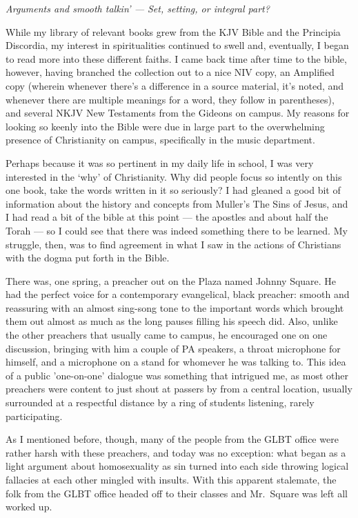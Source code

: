 \emph{Arguments and smooth talkin' --- Set, setting, or integral part?}

While my library of relevant books grew from the KJV Bible and the Principia Discordia, my interest in spiritualities continued to swell and, eventually, I began to read more into these different faiths. I came back time after time to the bible, however, having branched the collection out to a nice NIV copy, an Amplified copy (wherein whenever there's a difference in a source material, it's noted, and whenever there are multiple meanings for a word, they follow in parentheses), and several NKJV New Testaments from the Gideons on campus. My reasons for looking so keenly into the Bible were due in large part to the overwhelming presence of Christianity on campus, specifically in the music department.

Perhaps because it was so pertinent in my daily life in school, I was very interested in the `why' of Christianity. Why did people focus so intently on this one book, take the words written in it so seriously? I had gleaned a good bit of information about the history and concepts from Muller's The Sins of Jesus, and I had read a bit of the bible at this point --- the apostles and about half the Torah --- so I could see that there was indeed something there to be learned. My struggle, then, was to find agreement in what I saw in the actions of Christians with the dogma put forth in the Bible.

There was, one spring, a preacher out on the Plaza named Johnny Square. He had the perfect voice for a contemporary evangelical, black preacher: smooth and reassuring with an almost sing-song tone to the important words which brought them out almost as much as the long pauses filling his speech did. Also, unlike the other preachers that usually came to campus, he encouraged one on one discussion, bringing with him a couple of PA speakers, a throat microphone for himself, and a microphone on a stand for whomever he was talking to. This idea of a public 'one-on-one' dialogue was something that intrigued me, as most other preachers were content to just shout at passers by from a central location, usually surrounded at a respectful distance by a ring of students listening, rarely participating.

As I mentioned before, though, many of the people from the GLBT office were rather harsh with these preachers, and today was no exception: what began as a light argument about homosexuality as sin turned into each side throwing logical fallacies at each other mingled with insults. With this apparent stalemate, the folk from the GLBT office headed off to their classes and Mr.~Square was left all worked up.


